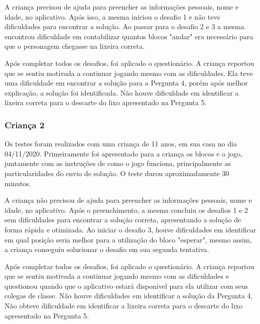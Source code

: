 A criança precisou de ajuda para preencher as informações pessoais, nome e idade, no aplicativo. Após isso, a mesma iniciou o desafio 1 e não teve dificuldades para encontrar a solução. Ao passar para o desafio 2 e 3 a mesma encontrou dificuldade em contabilizar quantos blocos "andar" era necessário para que o personagem chegasse na lixeira correta.

Após completar todos os desafios, foi aplicado o questionário. A criança reportou que se sentiu motivada a continuar jogando mesmo com as dificuldades. Ela teve uma dificuldade em encontrar a solução para a Pergunta 4, porém após melhor explicação, a solução foi identificada. Não houve dificuldade em identificar a lixeira correta para o descarte do lixo apresentado na Pergunta 5. 

\subsubsection{Criança 2}

Os testes foram realizados com uma criança de 11 anos, em sua casa no dia 04/11/2020. Primeiramente foi apresentado para a criança os blocos e o jogo, juntamente com as instruções de como o jogo funciona, principalmente as particularidades do envio de solução. O teste durou aproximadamente 30 minutos.

A criança não precisou de ajuda para preencher as informações pessoais, nome e idade, no aplicativo. Após o preenchimento, a mesma concluiu os desafios 1 e 2 sem dificuldades para encontrar a solução correta, apresentando a solução de forma rápida e otimizada. Ao iniciar o desafio 3, houve dificuldades em identificar em qual posição seria melhor para a utilização do bloco "esperar", mesmo assim, a criança conseguiu solucionar o desafio em sua segunda tentativa.

Após completar todos os desafios, foi aplicado o questionário. A criança reportou que se sentiu motivada a continuar jogando mesmo com as dificuldades e questionou quando que o aplicativo estará disponível para ela utilizar com seus colegas de classe.  Não houve dificuldades em identificar a solução da Pergunta 4. Não obteve dificuldade em identificar a lixeira correta para o descarte do lixo apresentado na Pergunta 5. 